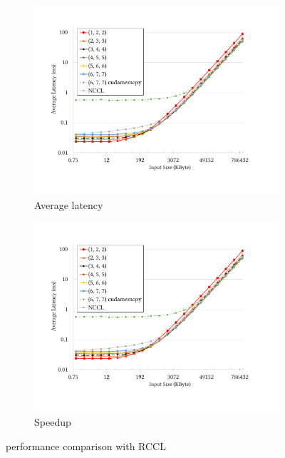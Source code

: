 \begin{figure}[h]
  \centering
  \begin{subfigure}[h]{0.5\textwidth}
    \includegraphics[page=7,width=\columnwidth]{figures/evals-camera-ready}
    \caption{Average latency}
    \label{fig:amd-res-allgather-avglat}
  \end{subfigure}%
  \begin{subfigure}[h]{0.5\textwidth}
    \includegraphics[page=8,width=\columnwidth]{figures/evals-camera-ready}
    \caption{Speedup}
    \label{fig:amd-res-allgather-speedup}
  \end{subfigure}%
  \caption{\allgather performance comparison with RCCL}
  \label{fig:amd-res-allgather}
\end{figure}

